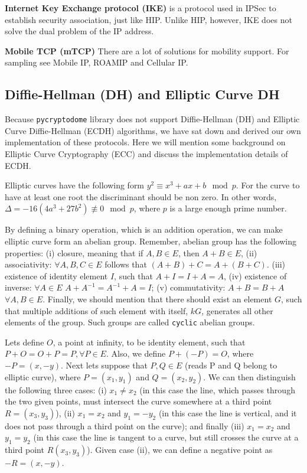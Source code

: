 {\bf Internet Key Exchange protocol (IKE)} is a protocol used in IPSec to establish
security association, just like HIP. Unlike HIP, however, IKE does not solve the 
dual problem of the IP address.

{\bf Mobile TCP (mTCP)} There are a lot of solutions for mobility support. 
For sampling see Mobile IP, ROAMIP and Cellular IP.

\subsection{Diffie-Hellman (DH) and Elliptic Curve DH}

Because \texttt{pycryptodome} library does not support 
Diffie-Hellman (DH) and Elliptic Curve Diffie-Hellman (ECDH) algorithms,
we have sat down and derived our own implementation of these
protocols. Here we will mention some background on Elliptic Curve Cryptography (ECC)
and discuss the implementation details of ECDH.

Elliptic curves have the following form $y^2 \equiv x^3+ax+b \mod p$. For the 
curve to have at least one root the discriminant should be non 
zero. In other words, $\Delta = -16(4a^3+27b^2) \not\equiv 0 \mod p$,
where $p$ is a large enough prime number.

By defining a binary operation, which is an addition operation, we can make 
elliptic curve form an abelian group. Remember, abelian group has the following
properties: (i) closure, meaning that if $A, B \in E$, then $A+B\in E$,
(ii) associativity: $\forall A,B,C \in E$ follows that $(A+B)+C=A+(B+C)$.
(iii) existence of identity element $I$, such that $A+I=I+A=A$, (iv)
existence of inverse: $\forall A \in E$ $A+A^{-1}=A^{-1}+A=I$; (v)
commutativity: $A+B=B+A$ $\forall A, B\in E$. Finally, we should 
mention that there should exist an element $G$, such that multiple additions 
of such element with itself, $kG$, generates all other elements of the group. Such groups
are called \texttt{cyclic} abelian groups.

Lets define $O$, a point at infinity, to be identity element, such 
that $P+O = O + P = P, \forall P \in E$. Also, we define 
$P+(-P)=O$, where $-P=(x, -y)$. Next lets 
suppose that $P, Q \in E$ (reads P and Q belong to elliptic curve), 
where $P=(x_1, y_1)$ and $Q=(x_2, y_2)$. We 
can then distinguish the following three cases: (i) $x_1 \neq x_2$ (in this
case the line, which passes through the two given points, 
must intersect the curve somewhere at a third point $R = (x_3, y_3)$), 
(ii) $x_1 = x_2$ and $y_1=-y_2$ (in this case the line is vertical, and it does not
pass through a third point on the curve); and finally (iii) $x_1=x_2$ and $y_1=y_2$
(in this case the line is tangent to a curve, but still crosses the curve at a 
third point $R(x_3, y_3)$). Given case (ii), we can define a negative point 
as $-R = (x, -y)$.

